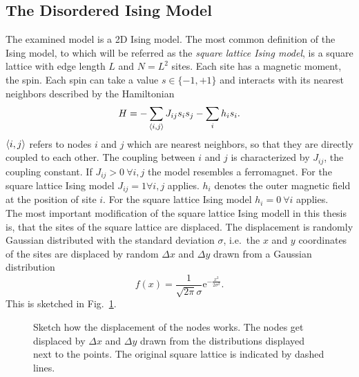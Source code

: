 \subsection{The Disordered Ising Model}
\label{ssec:isingmodel}
    The examined model is a 2D Ising model.
    The most common definition of the Ising model, to which will be referred
    as the \emph{square lattice Ising model}, is a square lattice with edge length \(L\) and
    \(N=L^2\) sites. Each site has a magnetic moment, the spin. Each
    spin can take a value \(s \in \{-1,+1\}\) and interacts with its
    nearest neighbors described by the Hamiltonian
    \begin{equation}
        H = - \sum_{\left< i,j \right>}J_{ij}s_{i}s_{j} - \sum_i h_i s_i.
        \label{eq:hamiltonian}
    \end{equation}
    \(\left< i,j \right>\) refers to nodes \(i\) and \(j\) which are nearest
    neighbors, so that they are directly coupled to each other. The
    coupling between \(i\) and \(j\) is characterized by \(J_{ij}\),
    the coupling constant. If \(J_{ij} > 0 \ \forall i,j\) the model resembles a ferromagnet.
    For the square lattice Ising model \(J_{ij}=1 \forall i,j\) applies.
    \(h_i\) denotes the outer magnetic field at the position of
    site \(i\). For the square lattice Ising model \(h_i=0 \ \forall i\)
    applies.\\
    The most important modification of the square lattice Ising modell in this
    thesis is, that the sites of the square lattice are displaced.
    The displacement is randomly Gaussian distributed with the standard
    deviation \(\sigma\), i.e.\ the \(x\) and \(y\) coordinates of the
    sites are displaced by random \(\Delta x\) and \(\Delta y\) drawn
    from a Gaussian distribution
    \begin{equation}
        f(x)=\frac{1}{\sqrt{2\pi}\sigma}\mathrm{e}^{-\frac{x^2}{2\sigma^2}}.
        \label{eq:gauss}
    \end{equation}
    This is sketched in Fig.\ \ref{fig:displacement}.
    \begin{figure}[htbp]
        \centering
        
        \caption[Sketch how the Displacement Works]
        {
            Sketch how the displacement of the nodes works. The nodes
            get displaced by \(\Delta x\) and \(\Delta y\) drawn from the
            distributions displayed next to the points. The original
            square lattice is indicated by dashed lines.
        }
        \label{fig:displacement}
    \end{figure}\\
